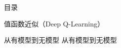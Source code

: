 \begin{frame}{目录}
    \tableofcontents
\end{frame}

\begin{section}{值函数近似\alert{（Deep Q-Learning）}}

\begin{frame}{从有模型到无模型}
    从有模型到无模型
\end{frame}

\end{section}